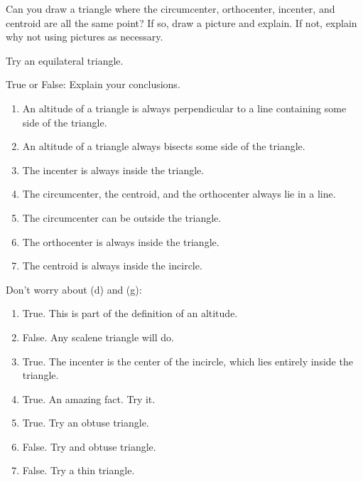 \documentclass[nooutcomes]{ximera}
\begin{document}
\begin{problem}
Can you draw a triangle where the circumcenter, orthocenter,
  incenter, and centroid are all the same point?  If so, draw a
  picture and explain. If not, explain why not using pictures as
  necessary.
\begin{freeResponse}
\begin{hint}
Try an equilateral triangle.  
\end{hint}
\end{freeResponse}
\end{problem}

\begin{problem}
True or False: Explain your conclusions.
\begin{enumerate}
\item An altitude of a triangle is always perpendicular to a line
  containing some side of the triangle.
\item An altitude of a triangle always bisects some side of the
  triangle.
\item The incenter is always inside the triangle.
\item The circumcenter, the centroid, and the orthocenter always lie in a line.
\item The circumcenter can be outside the triangle.
\item The orthocenter is always inside the triangle.
\item The centroid is always inside the incircle.
\end{enumerate}
\begin{freeResponse}
\begin{hint}
Don't worry about (d) and (g):
\begin{enumerate}
\item True.  This is part of the definition of an altitude.  %
\item False.  Any scalene triangle will do.  %
\item True.  The incenter is the center of the incircle, which lies entirely inside the triangle.  %
\item True.  An amazing fact.  Try it.  %
\item True.  Try an obtuse triangle.  %
\item False.  Try and obtuse triangle.  %
\item False.  Try a thin triangle.  %
\end{enumerate}
\end{hint}
\end{freeResponse}
\end{problem}
\end{document}
